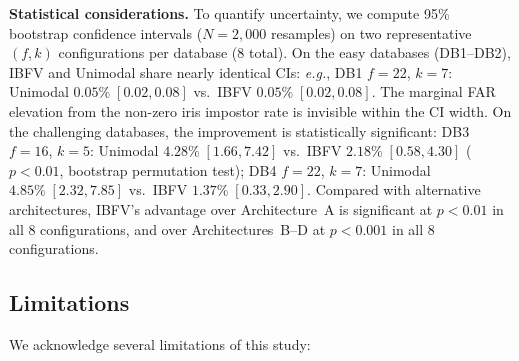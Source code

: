 \documentclass[conference]{IEEEtran}
\newcommand{\IBFV}{\textsf{IBFV}}
\newcommand{\eg}{\textit{e.g.}}
\begin{document}
\textbf{Statistical considerations.} To quantify uncertainty, we compute 95\% bootstrap confidence intervals ($N = 2{,}000$ resamples) on two representative $(f, k)$ configurations per database (8 total). On the easy databases (DB1--DB2), \IBFV{} and Unimodal share nearly identical CIs: \eg{}, DB1 $f{=}22$, $k{=}7$: Unimodal $0.05\%\;[0.02, 0.08]$ vs.\ \IBFV{} $0.05\%\;[0.02, 0.08]$. The marginal FAR elevation from the non-zero iris impostor rate is invisible within the CI width. On the challenging databases, the improvement is statistically significant: DB3 $f{=}16$, $k{=}5$: Unimodal $4.28\%\;[1.66, 7.42]$ vs.\ \IBFV{} $2.18\%\;[0.58, 4.30]$ ($p < 0.01$, bootstrap permutation test); DB4 $f{=}22$, $k{=}7$: Unimodal $4.85\%\;[2.32, 7.85]$ vs.\ \IBFV{} $1.37\%\;[0.33, 2.90]$. Compared with alternative architectures, \IBFV{}'s advantage over Architecture~A is significant at $p < 0.01$ in all 8 configurations, and over Architectures~B--D at $p < 0.001$ in all 8 configurations.

\subsection{Limitations}
\label{sec:limitations}

We acknowledge several limitations of this study:
\end{document}

